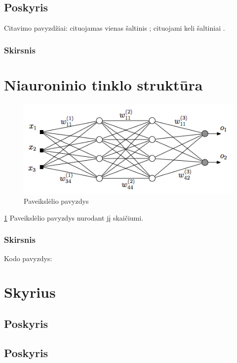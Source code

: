 \documentclass{VUMIFPSmagistrinis}
\begin{document}
\subsection{Poskyris}
Citavimo pavyzdžiai: cituojamas vienas šaltinis \cite{PvzStraipsnLt}; cituojami
keli šaltiniai \cite{PvzStraipsnEn, PvzKonfLt, PvzKonfEn, PvzKnygLt, PvzKnygEn,
PvzElPubLt, PvzElPubEn, PvzMagistrLt, PvzPhdEn}.

\subsubsection{Skirsnis}

\section{Niauroninio tinklo struktūra}
\begin{figure}[H]
    \centering
    \includegraphics[scale=0.5]{img/MLP}
    \caption{Paveikslėlio pavyzdys}
    \label{img:example}
\end{figure}

\ref{img:example} Paveikslėlio pavyzdys nurodant jį skaičiumi.

\subsubsection{Skirsnis}

Kodo pavyzdys:

\section{Skyrius}
\subsection{Poskyris}
\subsection{Poskyris}
\end{document}
